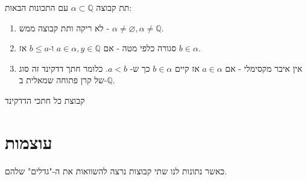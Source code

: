 \documentclass{tstextbook}
\begin{document}
\begin{definition}
תת קבוצה \(\alpha \subset \mathbb{Q}\) עם התכונות הבאות:

  \begin{enumerate}
    \item לא ריקה ותת קבוצה ממש - \(\alpha \neq \varnothing,\alpha \neq \mathbb{Q}\). 


    \item סגורה כלפי מטה - אם \(a \in \alpha, y \in \mathbb{Q}\) ו-\(b\leq a\) אז \(b \in \alpha\). 


    \item אין איבר מקסימלי - אם \(a \in \alpha\) אז קיים \(b \in \alpha\) כך ש- \(a < b\). 
כלומר חתך דדקינד זה סוג של קרן פתוחה שמאלית ב-\(\mathbb{Q}\).


  \end{enumerate}
\end{definition}
\begin{definition}
קבוצת כל חתכי הדדקינד

\end{definition}
\section{עוצמות}

כאשר נתונות לנו שתי קבוצות נרצה להשוואות את ה-"גדלים" שלהם.
\end{document}
